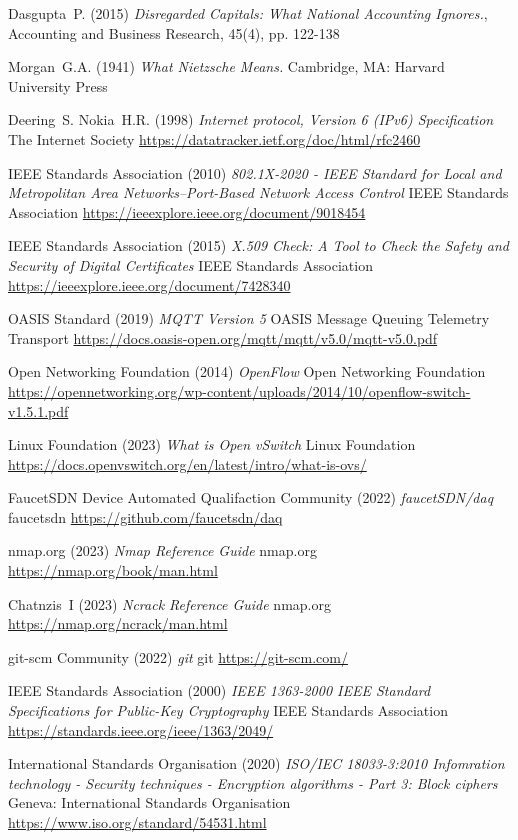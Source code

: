 \documentclass[11pt, oneside]{article}   	%
\begin{document}
\begin{thebibliography}{99}
 Dasgupta~P. (2015)
\emph{Disregarded Capitals: What National Accounting Ignores.},
Accounting and Business Research, 45(4), pp. 122-138
	
 Morgan~G.A. (1941)
\emph{What Nietzsche Means.}
Cambridge, MA: Harvard University Press

 Deering~S. Nokia~H.R. (1998)
\emph{Internet protocol, Version 6 (IPv6) Specification}
The Internet Society
\url{https://datatracker.ietf.org/doc/html/rfc2460}

 IEEE Standards Association (2010)
\emph{802.1X-2020 - IEEE Standard for Local and Metropolitan Area Networks--Port-Based Network Access Control}
IEEE Standards Association
\url{https://ieeexplore.ieee.org/document/9018454}

 IEEE Standards Association (2015)
\emph{X.509 Check: A Tool to Check the Safety and Security of Digital Certificates}
IEEE Standards Association
\url{https://ieeexplore.ieee.org/document/7428340}

 OASIS Standard (2019)
\emph{MQTT Version 5}
OASIS Message Queuing Telemetry Transport 
\url{https://docs.oasis-open.org/mqtt/mqtt/v5.0/mqtt-v5.0.pdf}

 Open Networking Foundation (2014)
\emph{OpenFlow}
Open Networking Foundation
\url{https://opennetworking.org/wp-content/uploads/2014/10/openflow-switch-v1.5.1.pdf}

 Linux Foundation (2023)
\emph{What is Open vSwitch}
Linux Foundation 
\url{https://docs.openvswitch.org/en/latest/intro/what-is-ovs/}

 FaucetSDN Device Automated Qualifaction Community (2022)
\emph{faucetSDN/daq}
faucetsdn
\url{https://github.com/faucetsdn/daq}

 nmap.org (2023)
\emph{Nmap Reference Guide}
nmap.org
\url{https://nmap.org/book/man.html}

 Chatnzis~I (2023)
\emph{Ncrack Reference Guide}
nmap.org
\url{https://nmap.org/ncrack/man.html}

 git-scm Community (2022)
\emph{git}
git
\url{https://git-scm.com/}

 IEEE Standards Association (2000)
\emph{IEEE 1363-2000 IEEE Standard Specifications for Public-Key Cryptography}
IEEE Standards Association
\url{https://standards.ieee.org/ieee/1363/2049/}

 International Standards Organisation (2020)
\emph{ISO/IEC 18033-3:2010 Infomration technology - Security techniques - Encryption algorithms - Part 3: Block ciphers}
Geneva: International Standards Organisation
\url{https://www.iso.org/standard/54531.html}


\end{thebibliography}
\end{document}
